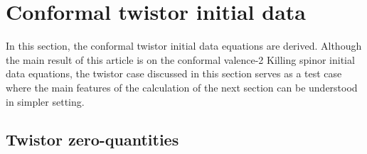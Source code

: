 \documentclass[10pt,a4paper]{article}
\theoremstyle{plain}
\begin{document}
{\color{blue}
  \section{Conformal twistor initial data}
  \label{conformalTwistorKID}
  In this section, the conformal twistor initial data equations are
  derived.  Although the main result of this article is on the
  conformal valence-2 Killing spinor initial data equations, the twistor
  case discussed in this section serves as a test case where the main
  features of the calculation of the next section can be understood in simpler setting.
\subsection{Twistor zero-quantities}
\label{Sec:TwistorZeroQuantities}

}
\end{document}
